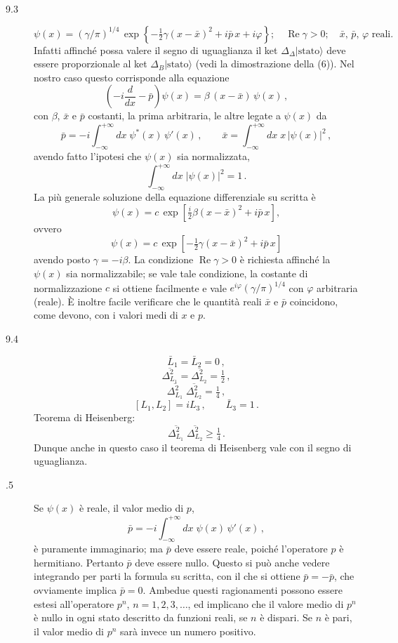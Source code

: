 \documentclass[11pt, a4paper]{book}
\numberwithin{equation}{section}
\begin{document}
\begin{description}
\item[9.3]
\[
  \psi(x) = (\gamma/\pi)^{1/4}\,
  \exp\!\left\{-\tfrac{1}{2}\gamma(x-\bar{x})^2 + i\bar{p}\,x + i\varphi\right\};
  \quad \operatorname{Re}\gamma > 0;\quad \bar{x},\,\bar{p},\,\varphi \text{ reali}.
\]
Infatti affinché possa valere il segno di uguaglianza il ket $\Delta_\Delta|\text{stato}\rangle$ deve essere proporzionale al ket $\Delta_B|\text{stato}\rangle$ (vedi la dimostrazione della (6)). Nel nostro caso questo corrisponde alla equazione
\[
  \left(-i\frac{d}{dx} - \bar{p}\right)\psi(x) = \beta\,(x-\bar{x})\,\psi(x)\,,
\]
con $\beta$, $\bar{x}$ e $\bar{p}$ costanti, la prima arbitraria, le altre legate a $\psi(x)$ da
\[
  \bar{p} = -i\int_{-\infty}^{+\infty} dx\;\psi^*(x)\,\psi'(x)\,,\qquad
  \bar{x} = \int_{-\infty}^{+\infty} dx\;x\,|\psi(x)|^2\,,
\]
avendo fatto l'ipotesi che $\psi(x)$ sia normalizzata,
\[
  \int_{-\infty}^{+\infty} dx\;|\psi(x)|^2 = 1\,.
\]
La più generale soluzione della equazione differenziale su scritta è
\[
  \psi(x) = c\,\exp\!\left[\tfrac{i}{2}\beta(x-\bar{x})^2 + i\bar{p}\,x\right],
\]
ovvero
\[
  \psi(x) = c\,\exp\!\left[-\tfrac{1}{2}\gamma(x-\bar{x})^2 + i\bar{p}\,x\right]
\]
avendo posto $\gamma = -i\beta$. La condizione $\operatorname{Re}\gamma > 0$ è richiesta affinché la $\psi(x)$ sia normalizzabile; se vale tale condizione, la costante di normalizzazione $c$ si ottiene facilmente e vale $e^{i\varphi}(\gamma/\pi)^{1/4}$ con $\varphi$ arbitraria (reale). È inoltre facile verificare che le quantità reali $\bar{x}$ e $\bar{p}$ coincidono, come devono, con i valori medi di $x$ e $p$.

\item[9.4]
\[
  \bar{L}_1 = \bar{L}_2 = 0\,,
\]
\[
  \overline{\Delta^2_{L_1}} = \overline{\Delta^2_{L_2}} = \tfrac{1}{2}\,,
\]
\[
  \overline{\Delta^2_{L_1}}\;\overline{\Delta^2_{L_2}} = \tfrac{1}{4}\,,
\]
\[
  [L_1,L_2] = iL_3\,,\qquad \bar{L}_3 = 1\,.
\]
Teorema di Heisenberg:
\[
  \overline{\Delta^2_{L_1}}\;\overline{\Delta^2_{L_2}} \geq \tfrac{1}{4}\,.
\]
Dunque anche in questo caso il teorema di Heisenberg vale con il segno di uguaglianza.

\item[.5] Se $\psi(x)$ è reale, il valor medio di $p$,
\[
  \bar{p} = -i\int_{-\infty}^{+\infty} dx\;\psi(x)\,\psi'(x)\,,
\]
è puramente immaginario; ma $\bar{p}$ deve essere reale, poiché l'operatore $p$ è hermitiano. Pertanto $\bar{p}$ deve essere nullo. Questo si può anche vedere integrando per parti la formula su scritta, con il che si ottiene $\bar{p} = -\bar{p}$, che ovviamente implica $\bar{p}=0$. Ambedue questi ragionamenti possono essere estesi all'operatore $p^n$, $n=1,2,3,\ldots$, ed implicano che il valore medio di $p^n$ è nullo in ogni stato descritto da funzioni reali, se $n$ è dispari. Se $n$ è pari, il valor medio di $p^n$ sarà invece un numero positivo.


\end{description}
\end{document}
